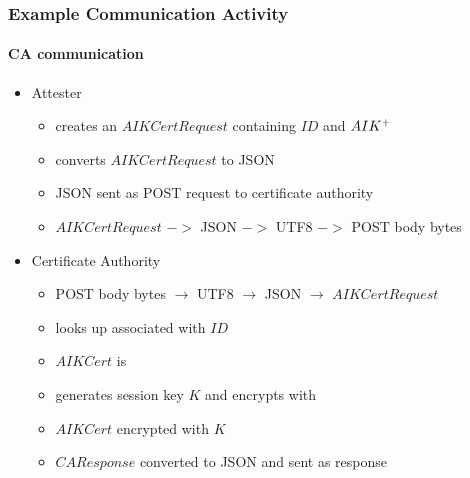 \documentclass{beamer}
\def \ca {CA}
\begin{document}
\begin{frame}
  \frametitle{Example Communication Activity}
  \framesubtitle{CA communication}

\begin{itemize}
\item Attester
  \begin{itemize}
  \item creates an $AIKCertRequest$ containing $ID$ and $AIK^{+}$
  \item converts $AIKCertRequest$ to JSON
  \item JSON sent as POST request to certificate authority
  \item $AIKCertRequest$ $->$ JSON $->$ UTF8 $->$ POST body bytes
  \end{itemize}
\item Certificate Authority
  \begin{itemize}
  \item POST body bytes $\rightarrow$ UTF8 $\rightarrow$ JSON $\rightarrow$ $AIKCertRequest$
  \item looks up  associated with $ID$
  \item $AIKCert$ is 
  \item generates session key $K$ and encrypts with 
  \item $AIKCert$ encrypted with $K$
  \item $CAResponse$ converted to JSON and sent as response
  \end{itemize}
\end{itemize}

\end{frame}

\end{document}
